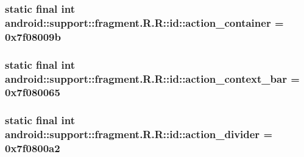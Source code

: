 \hypertarget{classandroid_1_1support_1_1fragment_1_1_r_1_1id_c8bb20edbdbcc4a44f6692a346d64690}{
\subsubsection[{action\_\-container}]{\setlength{\rightskip}{0pt plus 5cm}static final int android::support::fragment.R.R::id::action\_\-container = 0x7f08009b}}
\label{classandroid_1_1support_1_1fragment_1_1_r_1_1id_c8bb20edbdbcc4a44f6692a346d64690}


\hypertarget{classandroid_1_1support_1_1fragment_1_1_r_1_1id_fa0855e6db771f849b436f407109067e}{
\subsubsection[{action\_\-context\_\-bar}]{\setlength{\rightskip}{0pt plus 5cm}static final int android::support::fragment.R.R::id::action\_\-context\_\-bar = 0x7f080065}}
\label{classandroid_1_1support_1_1fragment_1_1_r_1_1id_fa0855e6db771f849b436f407109067e}


\hypertarget{classandroid_1_1support_1_1fragment_1_1_r_1_1id_3d5dc9ddc1255b34114d42e4a6e36646}{
\subsubsection[{action\_\-divider}]{\setlength{\rightskip}{0pt plus 5cm}static final int android::support::fragment.R.R::id::action\_\-divider = 0x7f0800a2}}
\label{classandroid_1_1support_1_1fragment_1_1_r_1_1id_3d5dc9ddc1255b34114d42e4a6e36646}


